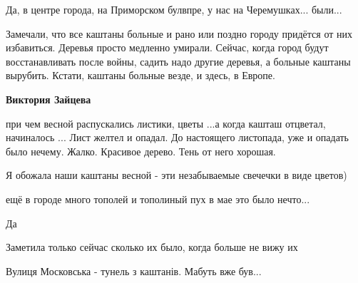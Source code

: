 Да, в центре города, на Приморском булвпре, у нас на Черемушках... были...


Замечали, что все каштаны больные и рано или поздно городу придётся от них
избавиться. Деревья просто медленно умирали. Сейчас, когда город будут
восстанавливать после войны, садить надо другие деревья, а больные каштаны
вырубить. Кстати, каштаны больные везде, и здесь, в Европе.

\begin{itemize} %
\textbf{Виктория Зайцева} 

при чем весной распускались листики, цветы ...а когда кашташ отцветал,
начиналось ... Лист желтел и опадал. До настоящего листопада, уже и опадать
было нечему. Жалко. Красивое дерево. Тень от него хорошая.

\end{itemize} %


Я обожала наши каштаны весной - эти незабываемые свечечки в виде цветов)


ещё в городе много тополей и тополиный пух в мае это было нечто...


Да


Заметила только сейчас сколько их было, когда больше не вижу их


Вулиця Московська - тунель з каштанів. Мабуть вже був...
